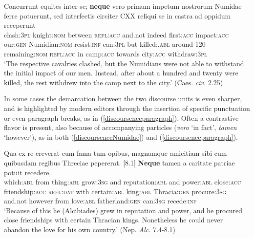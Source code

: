 \documentclass[output=paper,modfonts,nonflat,citecolor=brown,
showindex
]{langsci/langscibook}
\begin{document}
{\begin{exe}
\ex \label{discoursenecNumidae} \gll Concurrunt equites inter se; {\textbf{neque}} vero primum impetum nostrorum Numidae ferre potuerunt, sed interfectis circiter CXX reliqui se in castra ad oppidum receperunt\\
clash:{\textsc{3pl}} knight:{\textsc{nom}} between {\textsc{refl}}:{\textsc{acc}} and.not indeed first:{\textsc{acc}} impact:{\textsc{acc}} our:{\textsc{gen}} Numidian:{\textsc{nom}} resist:{\textsc{inf}} can:{\textsc{3pl}} but killed:{\ptcp}.{\textsc{abl}} around 120 remaining:{\textsc{nom}} {\textsc{refl}}:{\textsc{acc}} in camp:{\textsc{acc}} towards city:{\textsc{acc}} withdraw:{\textsc{3pl}}\\

`The respective cavalries clashed, but the Numidians were not able to withstand the initial impact of our men. Instead, after about a hundred and twenty were killed, the rest withdrew into the camp next to the city.' (Caes. {\emph{civ.}} 2.25)
\end{exe}}

\noindent In some cases the demarcation between the two discourse units is even sharper, and is highlighted by modern editors through the insertion of specific punctuation or even paragraph breaks, as in (\ref{discoursenecparagraph}). Often a contrastive flavor is present, also because of accompanying particles ({\emph{vero}} `in fact', {\emph{tamen}} `however'), as in both (\ref{discoursenecNumidae}) and (\ref{discoursenecparagraph}).

{\begin{exe}
\ex \label{discoursenecparagraph} \gll [7.4] Qua ex re creverat cum fama tum opibus, magnamque amicitiam sibi cum quibusdam regibus Threciae pepererat. [8.1] {\textbf{Neque}} tamen a caritate patriae potuit recedere.\\
\hspace{10 mm} which:{\textsc{abl}} from thing:{\textsc{abl}} grow:{\textsc{3sg}} and reputation:{\textsc{abl}} and power:{\textsc{abl}} close:{\textsc{acc}} friendship:{\textsc{acc}} {\textsc{refl:dat}} with certain:{\textsc{abl}} king:{\textsc{abl}} Thracia:{\textsc{gen}} procure:{\textsc{3sg}} \hspace{10 mm} and.not however from love:{\textsc{abl}} fatherland:{\textsc{gen}} can:{\textsc{3sg}} recede:{\textsc{inf}}\\

`Because of this he (Alcibiades) grew in reputation and power, and he procured close friendships with certain Thracian kings. Nonetheless he could never abandon the love for his own country.'
(Nep. {\emph{Alc.}} 7.4-8.1)
\end{exe}}
\end{document}
